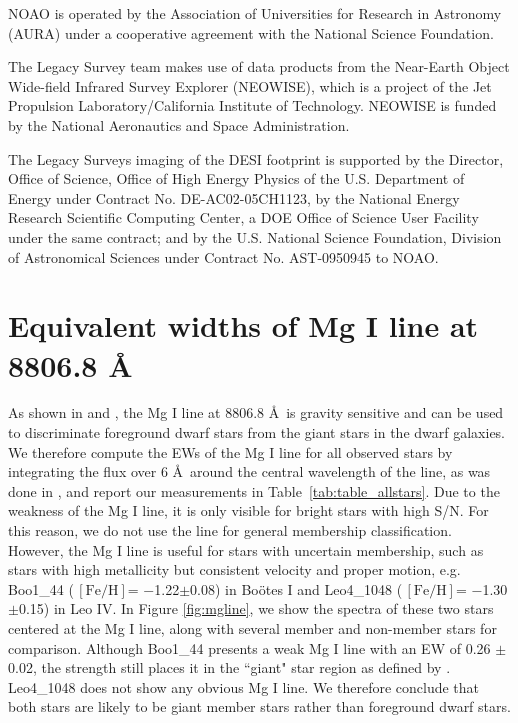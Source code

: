 \documentclass[twocolumn]{aastex63}
\newcommand{\unit}[1]{\ensuremath{\mathrm{\,#1}}\xspace}
\newcommand{\feh}{\unit{[Fe/H]}}
\newcommand{\revise}[1]{#1}
\begin{document}
NOAO is operated by the Association of Universities for Research in
Astronomy (AURA) under a cooperative agreement with the National
Science Foundation.

The Legacy Survey team makes use of data products from the Near-Earth
Object Wide-field Infrared Survey Explorer (NEOWISE), which is a
project of the Jet Propulsion Laboratory/California Institute of
Technology. NEOWISE is funded by the National Aeronautics and Space
Administration.

The Legacy Surveys imaging of the DESI footprint is supported by the
Director, Office of Science, Office of High Energy Physics of the
U.S. Department of Energy under Contract No. DE-AC02-05CH1123, by the
National Energy Research Scientific Computing Center, a DOE Office of
Science User Facility under the same contract; and by the
U.S. National Science Foundation, Division of Astronomical Sciences
under Contract No. AST-0950945 to NOAO.


{}


\clearpage

\appendix
\section{Equivalent widths of M\lowercase{g}  I line at 8806.8 \AA} 
\label{sec:mg_line}
As shown in \citet{bat2011} and \citet{bat2012}, the Mg I line at 8806.8 \AA~is gravity sensitive and can be used to discriminate foreground dwarf stars from the giant stars in the dwarf galaxies. We therefore compute the EWs of the Mg I line for all observed stars by integrating the flux over 6 \AA~around the central wavelength of the line, as was done in \citet{bat2011}, and report our measurements in Table~\ref{tab:table_allstars}. \revise{Due to the weakness of the Mg I line, it is only visible for bright stars with high S/N. For this reason, we do not use the line for general membership classification.} However, the Mg I line is useful for stars with uncertain membership, such as stars with high metallicity but consistent velocity and proper motion, e.g. Boo1\_44 (\feh = $-$1.22$\pm$0.08) in Bo{\"o}tes I and Leo4\_1048 (\feh = $-$1.30$\pm$0.15) in Leo IV. In Figure \ref{fig:mgline}, we show the spectra of these two stars centered at the Mg I line, along with several member and non-member stars for comparison. Although Boo1\_44 presents a weak Mg I line with an EW of 0.26 $\pm$ 0.02, the strength still places it in the ``giant" star region as defined by \citet{bat2012}. Leo4\_1048 does not show any obvious Mg I line. We therefore conclude that both stars are likely to be giant member stars rather than foreground dwarf stars.
\end{document}
